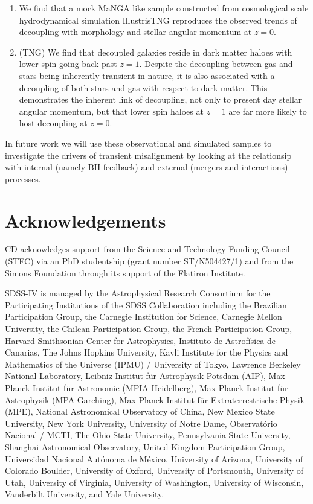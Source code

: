 \documentclass[fleqn,usenatbib]{mnras}
\begin{document}
\begin{enumerate}
    \item We find that a mock MaNGA like sample constructed from cosmological scale hydrodynamical simulation IllustrisTNG reproduces the observed trends of decoupling with morphology and stellar angular momentum at $z=0$.
    
    \item (TNG) We find that decoupled galaxies reside in dark matter haloes with lower spin going back past $z=1$. Despite the decoupling between gas and stars being inherently transient in nature, it is also associated with a decoupling of both stars and gas with respect to dark matter. This demonstrates the inherent link of decoupling, not only to present day stellar angular momentum, but that lower spin haloes at $z=1$ are far more likely to host decoupling at $z=0$. 

\end{enumerate}
In future work we will use these observational and simulated samples to investigate the drivers of transient misalignment by looking at the relationsip with internal (namely BH feedback) and external (mergers and interactions) processes. 





\section*{Acknowledgements}
CD acknowledges support from the Science and Technology Funding Council (STFC) via an PhD studentship (grant number ST/N504427/1) and from the Simons Foundation through its support of the Flatiron Institute. 

SDSS-IV is managed by the Astrophysical Research Consortium for the Participating Institutions of the SDSS Collaboration including the Brazilian Participation Group, the Carnegie Institution for Science, Carnegie Mellon University, the Chilean Participation Group, the French Participation Group, Harvard-Smithsonian Center for Astrophysics, Instituto de Astrof\'isica de Canarias, The Johns Hopkins University, Kavli Institute for the Physics and Mathematics of the Universe (IPMU) / University of Tokyo, Lawrence Berkeley National Laboratory, Leibniz Institut f\"ur Astrophysik Potsdam (AIP), Max-Planck-Institut f\"ur Astronomie (MPIA Heidelberg), Max-Planck-Institut f\"ur Astrophysik (MPA Garching), Max-Planck-Institut f\"ur Extraterrestrische Physik (MPE), National Astronomical Observatory of China, New Mexico State University, New York University, University of Notre Dame, Observat\'orio Nacional / MCTI, The Ohio State University, Pennsylvania State University, Shanghai Astronomical Observatory, United Kingdom Participation Group, Universidad Nacional Aut\'onoma de M\'exico, University of Arizona, University of Colorado Boulder, University of Oxford, University of Portsmouth, University of Utah, University of Virginia, University of Washington, University of Wisconsin, Vanderbilt University, and Yale University.
\appendix
\end{document}
